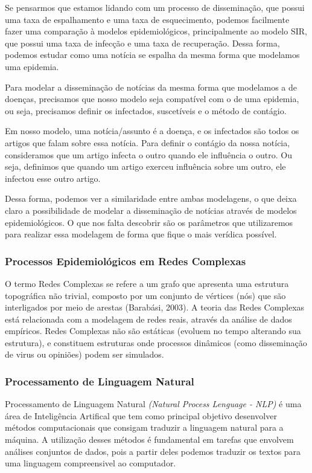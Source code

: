 \documentclass[a4paper,12pt]{article}
\begin{document}
Se pensarmos que estamos lidando com um processo de disseminação, que possui uma taxa de espalhamento e uma taxa de esquecimento, podemos
facilmente fazer uma comparação à modelos epidemiológicos, principalmente ao modelo SIR, que possui uma taxa de infecção e
uma taxa de recuperação. Dessa forma, podemos estudar como uma notícia se espalha da mesma forma que modelamos uma epidemia.

Para modelar a disseminação de notícias da mesma forma que modelamos a de doenças, precisamos
que nosso modelo seja compatível com o de uma epidemia, ou seja, precisamos definir os infectados, suscetíveis e o método de contágio.

Em nosso modelo, uma notícia/assunto é a doença, e os infectados são todos os artigos que falam sobre essa notícia. 
Para definir o contágio da nossa notícia, consideramos que um artigo infecta o outro quando ele influência o outro. Ou seja,
definimos que quando um artigo exerceu influência sobre um outro, ele infectou esse outro artigo. 

Dessa forma, podemos ver a similaridade entre ambas modelagens, o que deixa claro a possibilidade de modelar a disseminação de
notícias através de modelos epidemiológicos. O que nos falta descobrir são os parâmetros que utilizaremos para realizar essa modelagem
de forma que fique o mais verídica possível.

\subsubsection{Processos Epidemiológicos em Redes Complexas}

O termo Redes Complexas se refere a um grafo que apresenta uma estrutura topográfica não trivial, composto por um conjunto
 de vértices (nós) que são interligados por meio de arestas (Barabási, 2003). A teoria das Redes Complexas  está relacionada com a modelagem de redes reais, através da 
 análise de dados empíricos. Redes Complexas não são estáticas (evoluem no tempo alterando sua estrutura), e 
 constituem estruturas onde processos dinâmicos (como disseminação de virus ou opiniões) podem ser simulados.
 
 
\subsubsection{Processamento de Linguagem Natural}
\label{sec:nlp}

Processamento de Linguagem Natural \textit{(Natural Process Lenguage - NLP)} é uma área de Inteligência Artifical que tem como principal
objetivo desenvolver métodos computacionais que consigam traduzir a linguagem natural para a máquina. A utilização desses
métodos é fundamental em tarefas que envolvem análises conjuntos de dados, pois a partir deles podemos
traduzir os textos para uma linguagem compreensivel ao computador.
\end{document}
